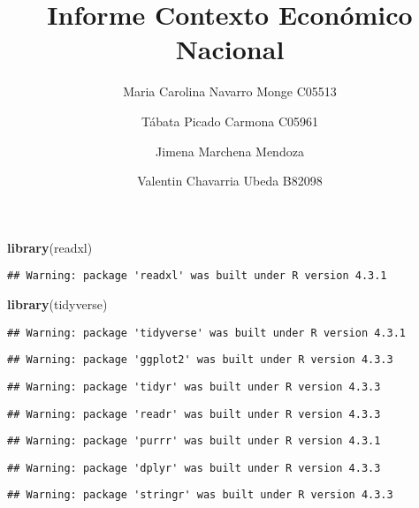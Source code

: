 \documentclass[
]{article}
\title{Informe Contexto Económico Nacional}
\author{Maria Carolina Navarro Monge C05513 \and Tábata Picado Carmona
C05961 \and Jimena Marchena Mendoza \and Valentin Chavarria Ubeda
B82098}
\date{}
\newenvironment{Shaded}{\begin{snugshade}}{\end{snugshade}}
\newcommand{\FunctionTok}[1]{\textcolor[rgb]{0.13,0.29,0.53}{\textbf{#1}}}
\newcommand{\NormalTok}[1]{#1}
\begin{document}
\maketitle

{
\setcounter{tocdepth}{2}
\tableofcontents
}
\begin{Shaded}
\begin{Highlighting}[]
\FunctionTok{library}\NormalTok{(readxl)}
\end{Highlighting}
\end{Shaded}

\begin{verbatim}
## Warning: package 'readxl' was built under R version 4.3.1
\end{verbatim}

\begin{Shaded}
\begin{Highlighting}[]
\FunctionTok{library}\NormalTok{(tidyverse)}
\end{Highlighting}
\end{Shaded}

\begin{verbatim}
## Warning: package 'tidyverse' was built under R version 4.3.1
\end{verbatim}

\begin{verbatim}
## Warning: package 'ggplot2' was built under R version 4.3.3
\end{verbatim}

\begin{verbatim}
## Warning: package 'tidyr' was built under R version 4.3.3
\end{verbatim}

\begin{verbatim}
## Warning: package 'readr' was built under R version 4.3.3
\end{verbatim}

\begin{verbatim}
## Warning: package 'purrr' was built under R version 4.3.1
\end{verbatim}

\begin{verbatim}
## Warning: package 'dplyr' was built under R version 4.3.3
\end{verbatim}

\begin{verbatim}
## Warning: package 'stringr' was built under R version 4.3.3
\end{verbatim}
\end{document}

